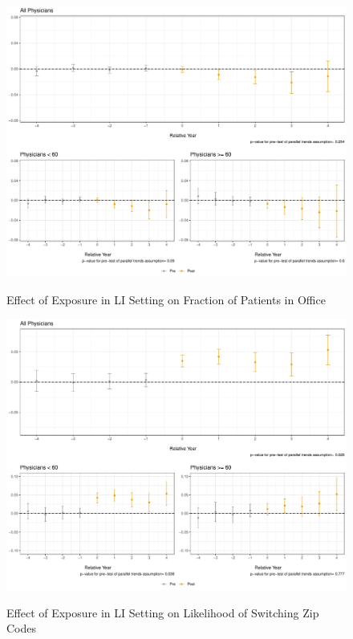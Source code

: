 \documentclass[11pt]{article}
\begin{document}
\begin{figure}[p]
    \centering
    \caption{Effect of Exposure in LI Setting on Fraction of Patients in Office}
    \includegraphics[scale=.4]{Objects/officefrac_plot_LI.pdf}
    \label{fig:officefrac_LI}
\end{figure}

\begin{figure}[p]
    \centering
    \caption{Effect of Exposure in LI Setting on Likelihood of Switching Zip Codes}
    \includegraphics[scale=.4]{Objects/zip_plot_LI.pdf}
    \label{fig:zip_LI}
\end{figure}
\end{document}
